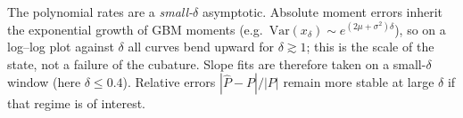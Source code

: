 The polynomial rates are a \emph{small-$\delta$} asymptotic. Absolute moment
errors inherit the exponential growth of GBM moments
(e.g.\ $\mathrm{Var}(x_\delta)\sim e^{(2\mu+\sigma^2)\delta}$), so on a
log--log plot against $\delta$ all curves bend upward for
$\delta\gtrsim 1$; this is the scale of the state, not a failure of the
cubature. Slope fits are therefore taken on a small-$\delta$ window
(here $\delta\le 0.4$). Relative errors $|\widehat{P}-P|/|P|$ remain more
stable at large $\delta$ if that regime is of interest.

